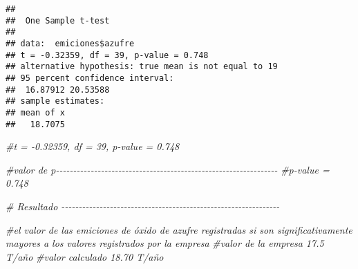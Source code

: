\documentclass[
]{article}
\newenvironment{Shaded}{\begin{snugshade}}{\end{snugshade}}
\newcommand{\CommentTok}[1]{\textcolor[rgb]{0.56,0.35,0.01}{\textit{#1}}}
\begin{document}
\begin{verbatim}
## 
##  One Sample t-test
## 
## data:  emiciones$azufre
## t = -0.32359, df = 39, p-value = 0.748
## alternative hypothesis: true mean is not equal to 19
## 95 percent confidence interval:
##  16.87912 20.53588
## sample estimates:
## mean of x 
##   18.7075
\end{verbatim}

\begin{Shaded}
\begin{Highlighting}[]
\CommentTok{\#t = {-}0.32359, df = 39, p{-}value = 0.748}

\CommentTok{\#valor de p{-}{-}{-}{-}{-}{-}{-}{-}{-}{-}{-}{-}{-}{-}{-}{-}{-}{-}{-}{-}{-}{-}{-}{-}{-}{-}{-}{-}{-}{-}{-}{-}{-}{-}{-}{-}{-}{-}{-}{-}{-}{-}{-}{-}{-}{-}{-}{-}{-}{-}{-}{-}{-}{-}{-}{-}{-}{-}{-}{-}{-}{-}{-}{-}}
\CommentTok{\#p{-}value = 0.748}

\CommentTok{\# Resultado {-}{-}{-}{-}{-}{-}{-}{-}{-}{-}{-}{-}{-}{-}{-}{-}{-}{-}{-}{-}{-}{-}{-}{-}{-}{-}{-}{-}{-}{-}{-}{-}{-}{-}{-}{-}{-}{-}{-}{-}{-}{-}{-}{-}{-}{-}{-}{-}{-}{-}{-}{-}{-}{-}{-}{-}{-}{-}{-}{-}{-}{-}{-}}

\CommentTok{\#el valor de las emiciones de óxido de azufre registradas si son significativamente mayores a los valores registrados por la empresa }
\CommentTok{\#valor de la empresa 17.5 T/año}
\CommentTok{\#valor calculado 18.70 T/año}
\end{Highlighting}
\end{Shaded}
\end{document}
